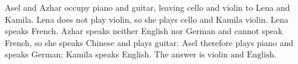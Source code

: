 Asel and Azhar occupy piano and guitar, leaving cello and violin to Lena and Kamila. Lena does not play violin, so she plays cello and Kamila violin. Lena speaks French. Azhar speaks neither English nor German and cannot speak French, so she speaks Chinese and plays guitar. Asel therefore plays piano and speaks German; Kamila speaks English. The answer is $\boxed{\text{violin and English}}$.

